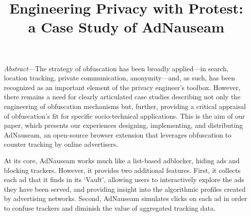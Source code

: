 \documentclass[conference]{IEEEtran}
\begin{document}
\title{Engineering Privacy with Protest:\\a Case Study of AdNauseam}

\author{
\and
{}
}

\maketitle

%
%

%


\emph{Abstract}---The strategy of obfuscation has been broadly applied---in search, location tracking, private communication, anonymity---and, as such, has been recognized as an important element of the privacy engineer's toolbox. However, there remains a need for clearly articulated case studies describing not only the engineering of obfuscation mechanisms but, further, providing a critical appraisal of obfuscation's fit for specific socio-technical applications. This is the aim of our paper, which presents our experiences designing, implementing, and distributing AdNauseam, an open-source browser extension that leverages obfuscation to counter tracking by online advertisers.

At its core, AdNauseam works much like a list-based adblocker, hiding ads and blocking trackers. However, it provides two additional features. First, it collects each ad that it finds in its `Vault', allowing users to interactively explore the ads they have been served, and providing insight into the algorithmic profiles created by advertising networks. Second, AdNauseam simulates clicks on each ad in order to confuse trackers and diminish the value of aggregated tracking data.
\end{document}
